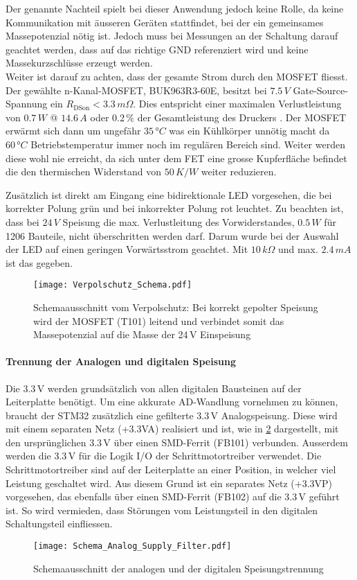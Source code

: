 Der genannte Nachteil spielt bei dieser Anwendung jedoch keine Rolle, da keine Kommunikation mit äusseren Geräten stattfindet, bei der ein gemeinsames Massepotenzial nötig ist. Jedoch muss bei Messungen an der Schaltung darauf geachtet werden, dass auf das richtige GND referenziert wird und keine Massekurzschlüsse erzeugt werden.\\
Weiter ist darauf zu achten, dass der gesamte Strom durch den MOSFET fliesst. Der gewählte n-Kanal-MOSFET, BUK963R3-60E, besitzt bei $7.5 \,\si{V}$ Gate-Source-Spannung ein $R_\text{DSon} <3.3 \,\si{m\Omega}$. Dies entspricht einer maximalen Verlustleistung von $0.7\,\si{W}$ @ $14.6\,\si{A}$ oder $0.2\,\%$ der Gesamtleistung des Druckers \cite{BUK963R3}. Der MOSFET erwärmt sich dann um ungefähr $35\,\si{\degree C}$ was ein Kühlkörper unnötig macht da $60\,\si{\degree C}$ Betriebstemperatur immer noch im regulären Bereich sind. Weiter werden diese wohl nie erreicht, da sich unter dem FET eine grosse Kupferfläche befindet die den thermischen Widerstand von $50\,\si{K/W}$ weiter reduzieren. 

Zusätzlich ist direkt am Eingang eine bidirektionale LED vorgesehen, die bei korrekter Polung grün und bei inkorrekter Polung rot leuchtet.
Zu beachten ist, dass bei $24\,\si{V}$ Speisung die max. Verlustleitung des Vorwiderstandes, $0.5\,\si{W}$ für 1206 Bauteile, nicht überschritten werden darf. Darum wurde bei der Auswahl der LED auf einen geringen Vorwärtsstrom geachtet. Mit $10\,\si{k\Omega}$ und max. $2.4\,\si{mA}$ ist das gegeben.

\begin{figure}[h]
	\centering
	\texttt{[image: Verpolschutz\_Schema.pdf]}
	\caption{Schemaausschnitt vom Verpolschutz: Bei korrekt gepolter Speisung wird der MOSFET (T101) leitend und verbindet somit das Massepotenzial auf die Masse der 24\,V Einspeisung}
	\label{pic:Schema_Verpolschutz}
\end{figure}

\vspace{3mm}
\paragraph{Trennung der Analogen und digitalen Speisung}
Die 3.3\,V werden grundsätzlich von allen digitalen Bausteinen auf der Leiterplatte benötigt.
Um eine akkurate AD-Wandlung vornehmen zu können, braucht der STM32 zusätzlich eine gefilterte 3.3\,V Analogspeisung.
Diese wird mit einem separaten Netz (+3.3VA) realisiert und ist, wie in \ref{pic:Schema_AVCC} dargestellt, mit den ursprünglichen 3.3\,V über einen SMD-Ferrit (FB101) verbunden.
Ausserdem werden die 3.3\,V für die Logik I/O der Schrittmotortreiber verwendet. Die Schrittmotortreiber sind auf der Leiterplatte an einer Position, in welcher viel Leistung geschaltet wird.
Aus diesem Grund ist ein separates Netz (+3.3VP) vorgesehen, das ebenfalls über einen SMD-Ferrit (FB102) auf die 3.3\,V geführt ist. 
So wird vermieden, dass Störungen vom Leistungsteil in den digitalen Schaltungsteil einfliessen.

\begin{figure}[h]
	\centering
	\texttt{[image: Schema\_Analog\_Supply\_Filter.pdf]}
	\caption{Schemaausschnitt der analogen und der digitalen Speisungstrennung}
	\label{pic:Schema_AVCC}
\end{figure}
